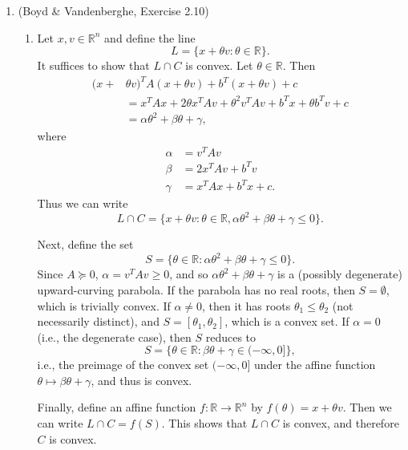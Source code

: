 \documentclass[letterpaper,12pt]{article}
\begin{document}
\begin{enumerate}
\item (Boyd \& Vandenberghe, Exercise 2.10)
\begin{enumerate}
\item Let $x, v \in \mathbb{R}^n$ and define the line
  \begin{equation*}
    L = \{x + \theta v : \theta \in \mathbb{R}\}.
  \end{equation*}
  It suffices to show that $L \cap C$ is convex. Let
  $\theta \in \mathbb{R}$. Then
  \begin{align*}
    (x +& \theta v)^T A (x + \theta v) + b^T (x + \theta v) + c \\
      &= x^T Ax + 2\theta x^T Av + \theta^2 v^T Av + b^T x + \theta b^T v + c \\
      &= \alpha \theta^2 + \beta \theta + \gamma,
  \end{align*}
  where
  \begin{align*}
    \alpha &= v^T Av \\
    \beta &= 2x^T Av + b^T v \\
    \gamma &= x^T Ax + b^T x + c.
  \end{align*}
  Thus we can write
  \begin{equation*}
    L \cap C = \{x + \theta v : \theta \in \mathbb{R},
      \alpha \theta^2 + \beta \theta + \gamma \leq 0\}.
  \end{equation*}

  Next, define the set
  \begin{equation*}
    S = \{\theta \in \mathbb{R} :
      \alpha \theta^2 + \beta \theta + \gamma \leq 0\}.
  \end{equation*}
  Since $A \succeq 0$, $\alpha = v^T Av \geq 0$, and so
  $\alpha \theta^2 + \beta \theta + \gamma$ is a (possibly degenerate)
  upward-curving parabola. If the parabola has no real roots, then
  $S = \emptyset$, which is trivially convex. If $\alpha \neq 0$, then
  it has roots $\theta_1 \leq \theta_2$ (not necessarily distinct),
  and $S = [\theta_1, \theta_2]$, which is a convex set. If
  $\alpha = 0$ (i.e., the degenerate case), then $S$ reduces to
  \begin{equation*}
    S = \{\theta \in \mathbb{R} : \beta \theta + \gamma \in (-\infty, 0]\},
  \end{equation*}
  i.e., the preimage of the convex set $(-\infty, 0]$ under the affine
  function $\theta \mapsto \beta \theta + \gamma$, and thus is convex.

  Finally, define an affine function $f : \mathbb{R} \to \mathbb{R}^n$ by
  $f(\theta) = x + \theta v$. Then we can write $L \cap C =
  f(S)$. This shows that $L \cap C$ is convex, and therefore $C$ is
  convex.


\end{enumerate}
\end{enumerate}
\end{document}

